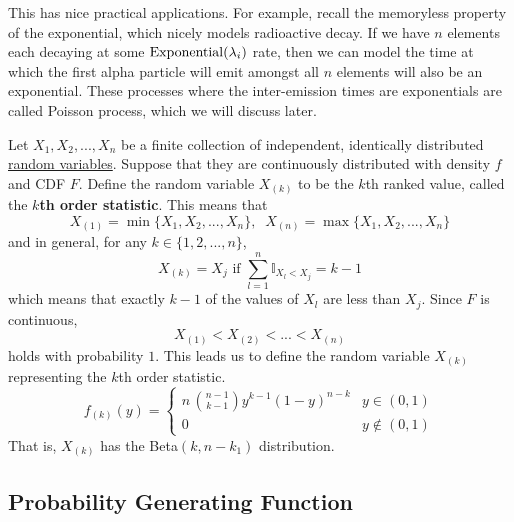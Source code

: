  This has nice practical applications. For example, recall the memoryless property of the exponential, which nicely models radioactive decay. If we have $n$ elements each decaying at some $\operatorname{Exponential}(\lambda_i)$ rate, then we can model the time at which the first alpha particle will emit amongst all $n$ elements will also be an exponential. These processes where the inter-emission times are exponentials are called Poisson process, which we will discuss later. 

  \begin{definition}
    \label{def:order-statistic}
    Let $X_1, X_2, ..., X_n$ be a finite collection of independent, identically distributed \hyperref[def:random-variable]{random variables}. Suppose that they are continuously distributed with density $f$ and CDF $F$. Define the random variable $X_{(k)}$ to be the $k$th ranked value, called the \textbf{$k$th order statistic}. This means that 
    \begin{equation}
      X_{(1)} = \min\{X_1, X_2, ..., X_n\}, \;\; X_{(n)} = \max\{X_1, X_2, ..., X_n\}
    \end{equation}
    and in general, for any $k \in \{1, 2, ..., n\}$, 
    \begin{equation}
      X_{(k)} = X_j \text{ if } \sum_{l=1}^n \mathbb{I}_{X_l < X_j} = k - 1
    \end{equation}
    which means that exactly $k-1$ of the values of $X_l$ are less than $X_j$. Since $F$ is continuous, 
    \begin{equation}
      X_{(1)} < X_{(2)} < ... < X_{(n)}
    \end{equation}
    holds with probability $1$. This leads us to define the random variable $X_{(k)}$ representing the $k$th order statistic.
    \begin{equation}
      f_{(k)} (y) = \begin{cases} 
      n \, \binom{n-1}{k-1} y^{k-1} (1-y)^{n-k} & y \in (0, 1) \\
      0 & y \not\in (0,1)
      \end{cases}
    \end{equation}
    That is, $X_{(k)}$ has the Beta$(k, n-k_1)$ distribution. 
  \end{definition}

\subsection{Probability Generating Function}

